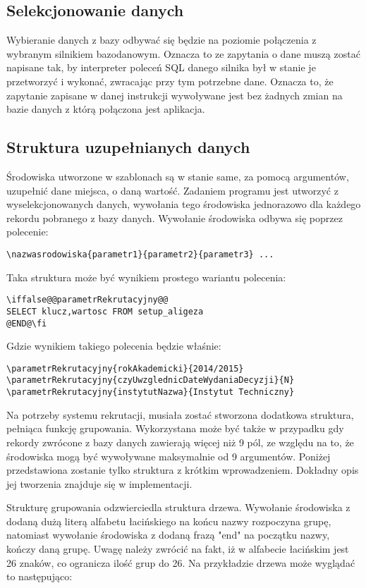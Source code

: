 \subsection{Selekcjonowanie danych}

Wybieranie danych z bazy odbywać się będzie na poziomie połączenia z wybranym silnikiem bazodanowym. Oznacza to ze zapytania o dane muszą zostać napisane tak, by interpreter poleceń SQL danego silnika był w stanie je przetworzyć i wykonać, zwracając przy tym potrzebne dane. Oznacza to, że zapytanie zapisane w danej instrukcji wywoływane jest bez żadnych zmian na bazie danych z którą połączona jest aplikacja.

\subsection{Struktura uzupełnianych danych}

Środowiska utworzone w szablonach są w stanie same, za pomocą argumentów, uzupełnić dane miejsca, o daną wartość. Zadaniem programu jest utworzyć z wyselekcjonowanych danych, wywołania tego środowiska jednorazowo dla każdego rekordu pobranego z bazy danych. Wywołanie środowiska odbywa się poprzez polecenie:
\begin{lstlisting}
\nazwasrodowiska{parametr1}{parametr2}{parametr3} ...
\end{lstlisting}

Taka struktura może być wynikiem prostego wariantu polecenia:
\begin{lstlisting}
\iffalse@@parametrRekrutacyjny@@
SELECT klucz,wartosc FROM setup_aligeza
@END@\fi
\end{lstlisting}
Gdzie wynikiem takiego polecenia będzie właśnie:
\begin{lstlisting}
\parametrRekrutacyjny{rokAkademicki}{2014/2015}
\parametrRekrutacyjny{czyUwzglednicDateWydaniaDecyzji}{N}
\parametrRekrutacyjny{instytutNazwa}{Instytut Techniczny}
\end{lstlisting}

Na potrzeby systemu rekrutacji, musiała zostać stworzona dodatkowa struktura, pełniąca funkcję grupowania. Wykorzystana może być także w przypadku gdy rekordy zwrócone z bazy danych zawierają więcej niż 9 pól, ze względu na to, że środowiska mogą być wywoływane maksymalnie od 9 argumentów. Poniżej przedstawiona zostanie tylko struktura z krótkim wprowadzeniem. Dokładny opis jej tworzenia znajduje się w implementacji.
\par
Strukturę grupowania odzwierciedla struktura drzewa. Wywołanie środowiska z dodaną dużą literą alfabetu łacińskiego na końcu nazwy rozpoczyna grupę, natomiast wywołanie środowiska z dodaną frazą "end" na początku nazwy, kończy daną grupę. Uwagę należy zwrócić na fakt, iż w alfabecie łacińskim jest 26 znaków, co ogranicza ilość grup do 26. Na przykładzie drzewa może wyglądać to następująco:

